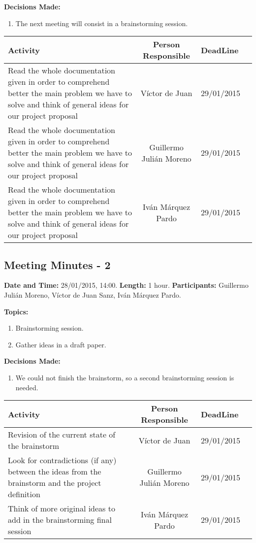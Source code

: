\textbf{Decisions Made:}\\
\begin{enumerate}
\item The next meeting will consist in a brainstorming session.
\end{enumerate}

\begin{tabular}{|p{5cm} c|p{5cm}|p{5cm}|}
\hline Activity & Person Responsible & DeadLine \\\hline
Read the whole documentation given in order to comprehend better the main problem we have to solve and think of general ideas for our project proposal & Víctor de Juan & 29/01/2015\\\hline

Read the whole documentation given in order to comprehend better the main problem we have to solve and think of general ideas for our project proposal & Guillermo Julián Moreno & 29/01/2015\\\hline

Read the whole documentation given in order to comprehend better the main problem we have to solve and think of general ideas for our project proposal & Iván Márquez Pardo & 29/01/2015\\\hline
\end{tabular}



\subsection{Meeting Minutes - 2}
\textbf{Date and Time:} 28/01/2015, 14:00. 
\textbf{Length:} 1 hour. 
\textbf{Participants: } Guillermo Julián Moreno, Víctor de Juan Sanz, Iván Márquez Pardo.

\textbf{Topics: } 
\begin{enumerate}
\item Brainstorming session.
\item Gather ideas in a draft paper.
\end{enumerate}

\textbf{Decisions Made:}\\
\begin{enumerate}
\item We could not finish the brainstorm, so a second brainstorming session is needed.
\end{enumerate}

\begin{tabular}{|p{5cm} c|p{5cm}|p{5cm}|}
\hline Activity & Person Responsible & DeadLine \\\hline
Revision of the current state of the brainstorm & Víctor de Juan & 29/01/2015\\\hline

Look for contradictions (if any) between the ideas from the brainstorm and the project definition & Guillermo Julián Moreno & 29/01/2015\\\hline

Think of more original ideas to add in the brainstorming final session & Iván Márquez Pardo & 29/01/2015\\\hline
\end{tabular}


